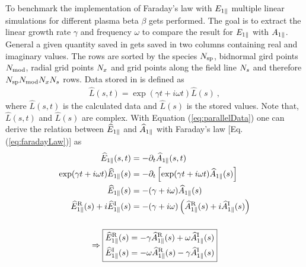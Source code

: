 To benchmark the implementation of Faraday's law with $E_{1\parallel}$ multiple linear simulations for different plasma beta $\beta$ gets performed. The goal is to extract the linear growth rate $\gamma$ and frequency $\omega$ to compare the result for $E_{1\parallel}$ with $A_{1\parallel}$. General a given quantity saved in  gets saved in two columns containing real and imaginary values. The rows are sorted by the species $N_\mathrm{sp}$, bidnormal gird points $N_\mathrm{mod}$, radial grid points $N_x$ and grid points along the field line $N_s$ and therefore $N_\mathrm{sp}N_\mathrm{mod}N_xN_s$ rows. Data stored in  is defined as
\begin{gather}
    \widehat{L}(s,t) = \exp (\gamma t + i\omega t) \widehat{L}(s)~,
    \label{eq:parallelData}
\end{gather}
where $\widehat{L}(s,t)$ is the calculated data and $\widehat{L}(s)$ is the stored values. \cite{GKWManual} Note that, $\widehat{L}(s,t)$ and $\widehat{L}(s)$ are complex. With Equation (\ref{eq:parallelData}) one can derive the relation between $\widehat{E}_{1\parallel}$ and $\widehat{A}_{1\parallel}$ with Faraday's law [Eq. (\ref{eq:faradayLaw})] as
\begin{gather}
    \begin{aligned}
        \widehat{E}_{1\parallel}(s,t) &= - \partial_t \widehat{A}_{1\parallel}(s,t) \\
        \exp (\gamma t + i\omega t) \widehat{E}_{1\parallel}(s) &= - \partial_t \left[\exp(\gamma t + i\omega t) \widehat{A}_{1\parallel}(s)\right] \\
        \widehat{E}_{1\parallel}(s) &= - (\gamma + i\omega) \widehat{A}_{1\parallel}(s) \\
        \widehat{E}_{1\parallel}^\mathrm{R}(s) + i \widehat{E}_{1\parallel}^\mathrm{I}(s) &= - (\gamma + i\omega) \left(\widehat{A}_{1\parallel}^\mathrm{R}(s) + i \widehat{A}_{1\parallel}^\mathrm{I}(s)\right)
    \end{aligned} \\[0.5cm] 
    \Rightarrow \boxed{
    \begin{aligned}
        \widehat{E}_{1\parallel}^\mathrm{R}(s) &= - \gamma \widehat{A}_{1\parallel}^\mathrm{R}(s) + \omega \widehat{A}_{1\parallel}^\mathrm{I}(s) \\ 
        \widehat{E}_{1\parallel}^\mathrm{I}(s) &= - \omega \widehat{A}_{1\parallel}^\mathrm{R}(s) - \gamma \widehat{A}_{1\parallel}^\mathrm{I}(s)   
    \end{aligned}
    } \nonumber
    \label{eq:parallelDataEparEqApar}
\end{gather}

\newpage

